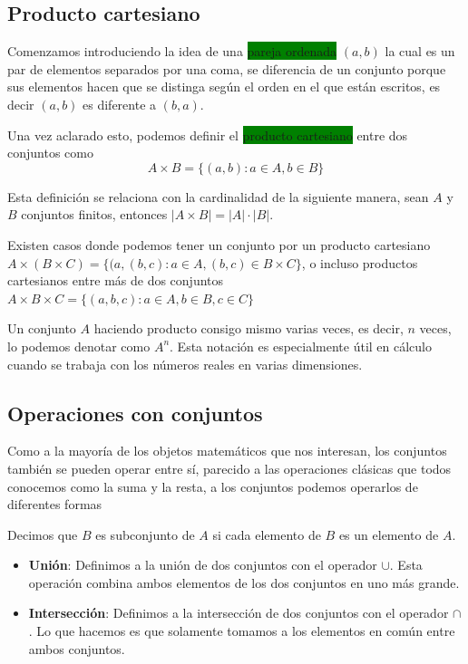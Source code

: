 \documentclass[11pt]{article}
\begin{document}
\subsection{Producto cartesiano}

Comenzamos introduciendo la idea de una \colorbox{Green}{pareja ordenada} $(a,b)$ la cual es un par de elementos separados por una coma, se diferencia de un conjunto porque sus elementos hacen que se distinga según el orden en el que están escritos, es decir $(a,b)$ es diferente a $(b,a)$. 

Una vez aclarado esto, podemos definir el \colorbox{Green}{producto cartesiano} entre dos conjuntos como 
\[
A\times B=\{ (a,b):a\in A, b\in B \}
\]

Esta definición se relaciona con la cardinalidad de la siguiente manera, sean $A$ y $B$ conjuntos finitos, entonces $|A\times B| = |A|\cdot |B|$.

Existen casos donde podemos tener un conjunto por un producto cartesiano $A\times (B\times C)=\{ (a,(b,c):a\in A, (b,c)\in B\times C \}$, o incluso productos cartesianos entre más de dos conjuntos $A\times B\times C=\{ (a,b,c):a\in A, b\in B ,c\in C\}$

Un conjunto $A$ haciendo producto consigo mismo varias veces, es decir, $n$ veces, lo podemos denotar como $A^n$. Esta notación es especialmente útil en cálculo cuando se trabaja con los números reales en varias dimensiones.

\subsection{Operaciones con conjuntos}

Como a la mayoría de los objetos matemáticos que nos interesan, los conjuntos también se pueden operar entre sí, parecido a las operaciones clásicas que todos conocemos como la suma y la resta, a los conjuntos podemos operarlos de diferentes formas

Decimos que $B$ es subconjunto de $A$ si cada elemento de $B$ es un elemento de $A$.

\begin{itemize}
    \item \textbf{Unión}: Definimos a la unión de dos conjuntos con el operador $\cup$. Esta operación combina ambos elementos de los dos conjuntos en uno más grande.
    \item \textbf{Intersección}: Definimos a la intersección de dos conjuntos con el operador $\cap$. Lo que hacemos es que solamente tomamos a los elementos en común entre ambos conjuntos.
\end{itemize}
\end{document}
